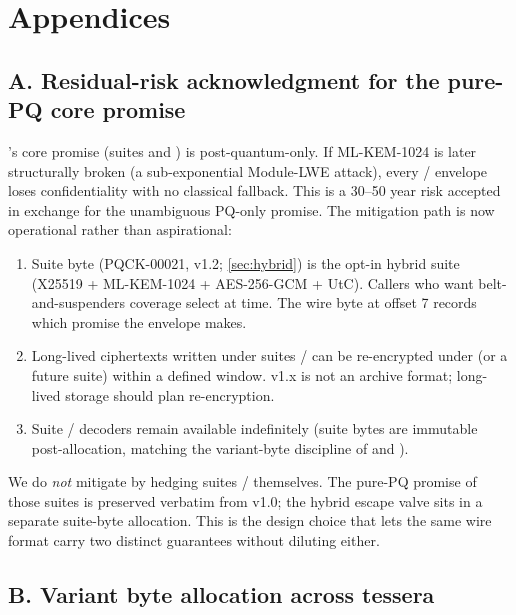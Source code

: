 \section{Appendices}
\label{sec:appendices}

\subsection*{A. Residual-risk acknowledgment for the pure-PQ core promise}

\pqcrypt{}'s core promise (suites  and ) is post-quantum-only. If ML-KEM-1024 is later structurally broken (a sub-exponential Module-LWE attack), every / envelope loses confidentiality with no classical fallback. This is a 30--50 year risk accepted in exchange for the unambiguous PQ-only promise. The mitigation path is now operational rather than aspirational:

\begin{enumerate}
\item Suite byte  (PQCK-00021, v1.2; \cref{sec:hybrid}) is the opt-in hybrid suite (X25519 + ML-KEM-1024 + AES-256-GCM + UtC). Callers who want belt-and-suspenders coverage select  at  time. The wire byte at offset 7 records which promise the envelope makes.
\item Long-lived ciphertexts written under suites / can be re-encrypted under  (or a future suite) within a defined window. \pqcrypt{} v1.x is not an archive format; long-lived storage should plan re-encryption.
\item Suite / decoders remain available indefinitely (suite bytes are immutable post-allocation, matching the variant-byte discipline of \pqid{} and \pqhash{}).
\end{enumerate}

We do \emph{not} mitigate by hedging suites / themselves. The pure-PQ promise of those suites is preserved verbatim from v1.0; the hybrid escape valve sits in a separate suite-byte allocation. This is the design choice that lets the same wire format carry two distinct guarantees without diluting either.

\subsection*{B. Variant byte allocation across tessera}

